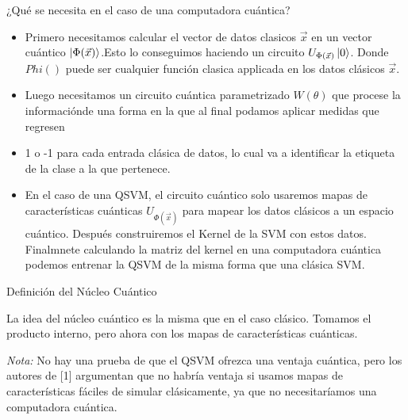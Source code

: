 \documentclass{beamer}
\begin{document}
\begin{frame}{¿Qué se necesita en el caso de una computadora cuántica?}
    \begin{itemize}
        \item Primero necesitamos calcular el vector de datos clasicos $\vec{x}$ en un vector cuántico $\ket{\Phi(\vec{x})}$.Esto lo conseguimos
        haciendo un circuito \(U_{\Phi(\vec{x})}\ket{0}\). Donde \(Phi()\) puede ser cualquier función clasica applicada en los datos clásicos $\vec{x}$.
        \item Luego necesitamos un circuito cuántica parametrizado \(W(\theta)\) que procese la informaciónde una forma en la que al final podamos aplicar medidas que regresen 
        \item 1 o -1 para cada entrada clásica de datos, lo cual va a identificar la etiqueta de la clase a la que pertenece.
    
    \end{itemize}
\end{frame}
\begin{frame}
    \begin{itemize}
        \item En el caso de una QSVM, el circuito cuántico solo usaremos mapas de características cuánticas \(U_{\Phi(\vec{x})}\) para mapear los datos clásicos a un espacio cuántico. Después
        construiremos el Kernel de la SVM con estos datos. Finalmnete calculando la matriz del kernel en una computadora cuántica podemos entrenar la QSVM de la misma forma que una clásica
        SVM.

    \end{itemize}
\end{frame}


\begin{frame}{Definición del Núcleo Cuántico}

    La idea del núcleo cuántico es la misma que en el caso clásico. Tomamos el producto interno, pero ahora con los mapas de características cuánticas.

    \textit{Nota:} No hay una prueba de que el QSVM ofrezca una ventaja cuántica, pero los autores de [1] argumentan que no habría ventaja si usamos mapas de características fáciles de simular clásicamente, ya que no necesitaríamos una computadora cuántica.

\end{frame}
\end{document}
